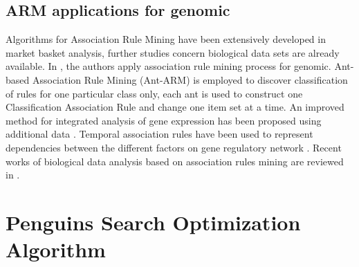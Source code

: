 \documentclass[preprint,12pt]{elsarticle}
\begin{document}
\subsection{ARM applications for genomic}
Algorithms for Association Rule Mining have been extensively developed in market basket analysis, further studies concern  biological data sets are already available.
 In \cite{23}, the authors apply association rule mining process for genomic. 
 Ant-based Association Rule Mining (Ant-ARM) is employed to discover classification of rules for one particular class only, each ant is used to construct one  Classification Association Rule and change one item set at a time. An improved method for integrated analysis of gene expression has been 
 proposed using additional data \cite{24}. Temporal association rules have been used to represent dependencies between the different factors 
 on gene regulatory network \cite{25}. Recent works of biological data analysis based on association rules mining are reviewed in \cite{26}.

\section{Penguins Search Optimization Algorithm }
\end{document}
